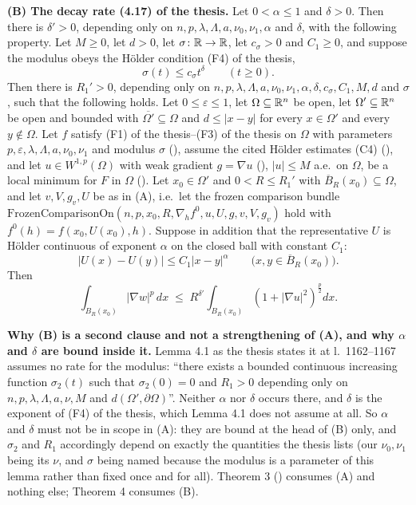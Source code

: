 \begin{lemma}
\medskip
\noindent\textbf{(B) The decay rate (4.17) of the thesis.}  Let $0<\alpha\le1$ and
$\delta>0$.  Then there is $\delta'>0$, depending only on
$n,p,\lambda,\Lambda,a,\nu_0,\nu_1,\alpha$ and $\delta$, with the following
property.  Let $M\ge0$, let $d>0$, let $\sigma\colon\mathbb{R}\to\mathbb{R}$, let $c_\sigma>0$
and $C_1\ge0$, and suppose the modulus obeys the H\"older condition
(F4) of the thesis,
\[
\sigma(t)\le c_\sigma t^{\delta}\qquad(t\ge0).
\]
Then there is $R_1'>0$, depending only on
$n,p,\lambda,\Lambda,a,\nu_0,\nu_1,\alpha,\delta,c_\sigma,C_1,M,d$ and
$\sigma$, such that the following holds.  Let $0\le\varepsilon\le1$, let
$\Omega\subseteq\mathbb{R}^n$ be open, let $\Omega'\subseteq\mathbb{R}^n$ be open and bounded
with $\overline{\Omega'}\subseteq\Omega$ and $d\le|x-y|$ for every
$x\in\Omega'$ and every $y\notin\Omega$.  Let $f$ satisfy
(F1) of the thesis--(F3) of the thesis on $\Omega$ with parameters
$p,\varepsilon,\lambda,\Lambda,a,\nu_0,\nu_1$ and modulus $\sigma$
(), assume the cited H\"older estimates (C4)
(), and let $u\in W^{1,p}(\Omega)$ with weak
gradient $g=\nabla u$ (), $|u|\le M$ a.e.\ on $\Omega$, be a
local minimum for $F$ in $\Omega$ ().  Let
$x_0\in\Omega'$ and $0<R\le R_1'$ with $\overline B_R(x_0)\subseteq\Omega$, and
let $v,V,g_v,U$ be as in (A), i.e.\ let the frozen comparison bundle
$\mathrm{FrozenComparisonOn}(n,p,x_0,R,\nabla_hf^0,u,U,g,v,V,g_v)$ hold with
$f^0(h)=f(x_0,U(x_0),h)$.  Suppose in addition that the representative $U$ is
H\"older continuous of exponent $\alpha$ on the closed ball with constant
$C_1$:
\[
|U(x)-U(y)|\le C_1|x-y|^{\alpha}
\qquad\bigl(x,y\in\overline B_R(x_0)\bigr).
\]
Then
\[
\int_{B_R(x_0)}|\nabla w|^p\,dx\;\le\;R^{\delta'}\int_{B_R(x_0)}(1+|\nabla u|^2)^{\frac p2}dx .
\tag{4.17}
\]

\medskip
\noindent\textbf{Why (B) is a second clause and not a strengthening of (A), and
why $\alpha$ and $\delta$ are bound inside it.}  Lemma 4.1 as the thesis states
it at l.~1162--1167 assumes no rate for the modulus: ``there exists a bounded
continuous increasing function $\sigma_2(t)$ such that $\sigma_2(0)=0$ and
$R_1>0$ depending only on $n,p,\lambda,\Lambda,a,\nu,M$ and
$d(\Omega',\partial\Omega)$''.  Neither $\alpha$ nor $\delta$ occurs there, and
$\delta$ is the exponent of (F4) of the thesis, which Lemma 4.1 does not assume at
all.  So $\alpha$ and $\delta$ must not be in scope in (A): they are bound at
the head of (B) only, and $\sigma_2$ and $R_1$ accordingly depend on exactly the
quantities the thesis lists (our $\nu_0,\nu_1$ being its $\nu$, and $\sigma$
being named because the modulus is a parameter of this lemma rather than fixed
once and for all).  Theorem 3 () consumes (A)
and nothing else; Theorem 4 consumes (B).


\end{lemma}
